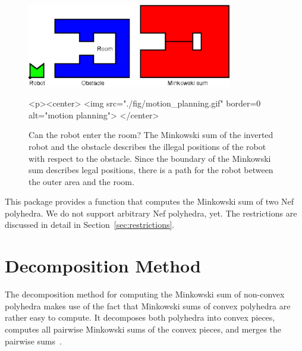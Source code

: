 \begin{figure}
  \begin{ccTexOnly}
    \begin{center}
      \includegraphics[width=0.8\textwidth]{Minkowski_sum_3/fig/motion_planning}
    \end{center}
  \end{ccTexOnly}
  \begin{ccHtmlOnly}
    <p><center>
    <img src="./fig/motion_planning.gif" border=0 alt="motion
    planning">
    </center>
  \end{ccHtmlOnly}
  \caption{Can the robot enter the room? The Minkowski sum of the inverted
           robot and the obstacle describes the illegal positions of the 
           robot with respect to the obstacle. 
           Since the boundary of the Minkowski sum describes legal
           positions, there
           is a path for the robot between the outer area and the room.}
  \label{fig:motionPlanning}
\end{figure}

This package provides a function  that computes
the Minkowski sum of two Nef polyhedra. We do not support arbitrary
Nef polyhedra, yet. The restrictions are discussed in detail in
Section~\ref{sec:restrictions}.

\section{Decomposition Method}

The decomposition method for computing the Minkowski sum of non-convex
polyhedra makes use of the fact that Minkowski sums of convex
polyhedra are rather easy to compute. It decomposes both polyhedra
into convex pieces, computes all pairwise Minkowski sums of the convex
pieces, and merges the pairwise sums~\cite{bkos-cgaa-97}.

